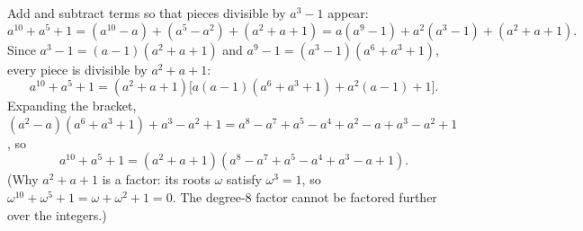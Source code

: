 Add and subtract terms so that pieces divisible by $a^3-1$ appear:
\[
a^{10}+a^5+1=(a^{10}-a)+(a^5-a^2)+(a^2+a+1)=a(a^9-1)+a^2(a^3-1)+(a^2+a+1).
\]
Since $a^3-1=(a-1)(a^2+a+1)$ and $a^9-1=(a^3-1)(a^6+a^3+1)$, every piece is divisible by $a^2+a+1$:
\[
a^{10}+a^5+1=(a^2+a+1)\bigl[a(a-1)(a^6+a^3+1)+a^2(a-1)+1\bigr].
\]
Expanding the bracket, $(a^2-a)(a^6+a^3+1)+a^3-a^2+1=a^8-a^7+a^5-a^4+a^2-a+a^3-a^2+1$, so
\[
\boxed{a^{10}+a^5+1=(a^2+a+1)(a^8-a^7+a^5-a^4+a^3-a+1)}.
\]
(Why $a^2+a+1$ is a factor: its roots $\omega$ satisfy $\omega^3=1$, so $\omega^{10}+\omega^5+1=\omega+\omega^2+1=0$. The degree-$8$ factor cannot be factored further over the integers.)
